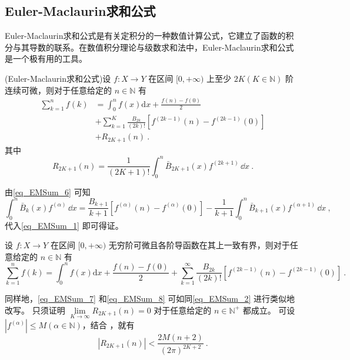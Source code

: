 \subsection{Euler-Maclaurin求和公式}

Euler-Maclaurin求和公式是有关定积分的一种数值计算公式，它建立了函数的积分与其导数的联系。在数值积分理论与级数求和法中，Euler-Maclaurin求和公式是一个极有用的工具。

\begin{theorem}{}
(Euler-Maclaurin求和公式)设 $f:X\to Y$ 在区间 $[0,+\infty)$ 上至少 $2K(K\in{\mathbb N})$ 阶连续可微，则对于任意给定的 $n\in\mathbb N$ 有
\begin{equation}\label{eq_EMSum_7}
\begin{aligned}
    \sum_{k=1}^{n}f(k)&=\int_{0}^{n}f(x)\mathrm{d}x+\frac{f(n)-f(0)}{2}\\
    &+\sum_{k=1}^{K}\frac{B_{2k}}{(2k)!}[f^{(2k-1)}(n)-f^{(2k-1)}(0)]\\
    &+R_{2K+1}(n)~.
\end{aligned}
\end{equation}
其中
\begin{equation}
    R_{2K+1}(n)=\frac{1}{(2K+1)!}\int_{0}^{n}\bar{B}_{2K+1}(x)f^{(2k+1)}\,\dd x~.
\end{equation}
\end{theorem}
由\autoref{eq_EMSum_6} 可知
\begin{equation}
    \int_{0}^{n}\bar{B}_{k}(x)f^{(\alpha)}\,\dd x
    =\frac{B_{k+1}}{k+1}[f^{(\alpha)}(n)-f^{(\alpha)}(0)]
    -\frac{1}{k+1}\int_{0}^{n}\bar{B}_{k+1}(x)f^{(\alpha+1)}\,\dd x~,
\end{equation}
 代入\autoref{eq_EMSum_1} 即可得证。
\begin{theorem}{}
设 $f:X\to Y$ 在区间 $[0,+\infty)$ 无穷阶可微且各阶导函数在其上一致有界，则对于任意给定的 $n\in\mathbb N$ 有
\begin{equation}\label{eq_EMSum_8}
    \sum_{k=1}^{n}f(k)=\int_{0}^{n}f(x)\mathrm{d}x+\frac{f(n)-f(0)}{2}
    +\sum_{k=1}^{\infty}\frac{B_{2k}}{(2k)!}[f^{(2k-1)}(n)-f^{(2k-1)}(0)]~.
\end{equation}
\end{theorem}
同样地，\autoref{eq_EMSum_7} 和\autoref{eq_EMSum_8} 可如同\autoref{eq_EMSum_2} 进行类似地改写。
只须证明 $\lim\limits_{K\to\infty}R_{2K+1}(n)=0$ 对于任意给定的 $n\in{\mathbb N^{+}}$ 都成立。
可设 $|f^{(\alpha)}|\leqslant M(\alpha\in{\mathbb N})$，结合 ，就有
\begin{equation}
        |R_{2K+1}(n)|<\frac{2M(n+2)}{(2\pi)^{2K+2}}~.
\end{equation}
